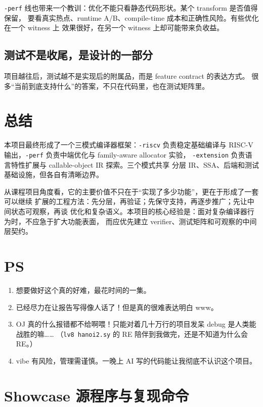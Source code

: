 \documentclass[UTF8,a4paper,11pt]{ctexart}
\begin{document}
\texttt{-perf} 线也带来一个教训：优化不能只看静态代码形状。某个 transform 是否值得保留，
要看真实热点、runtime A/B、compile-time 成本和正确性风险。有些优化在一个 witness 上
效果很好，在另一个 witness 上却可能带来负收益。

\subsection{测试不是收尾，是设计的一部分}

项目越往后，测试越不是实现后的附属品，而是 feature contract 的表达方式。
很多“当前到底支持什么”的答案，不只在代码里，也在测试矩阵里。

\section{总结}

本项目最终形成了一个三模式编译器框架：\texttt{-riscv} 负责稳定基础编译与
RISC-V 输出，\texttt{-perf} 负责中端优化与 family-aware allocator 实验，
\texttt{-extension} 负责语言特性扩展与 callable-object IR 探索。三个模式共享
分层 IR、SSA、后端和测试基础设施，但各自有清晰边界。

从课程项目角度看，它的主要价值不只在于“实现了多少功能”，更在于形成了一套可以继续
扩展的工程方法：先分层，再验证；先保守支持，再逐步推广；先让中间状态可观察，再谈
优化和复杂语义。本项目的核心经验是：面对复杂编译器行为时，不应急于扩大功能表面，
而应优先建立 verifier、测试矩阵和可观察的中间层契约。

\section*{PS}

\begin{enumerate}[label=\arabic*.]
  \item 想要做好这个真的好难，最花时间的一集。
  \item 已经尽力在让报告写得像人话了！但是真的很难表达明白 www。
  \item OJ 真的什么报错都不给啊喂！只能对着几十万行的项目发呆 debug 是人类能战胜的嘛……
  （\texttt{lv8 hanoi2.sy} 的 RE 陪伴到我做完，还是不知道为什么会 RE。）
  \item vibe 有风险，管理需谨慎。一晚上 AI 写的代码能让我彻底不认识这个项目。
\end{enumerate}

\appendix

\section{Showcase 源程序与复现命令}
\end{document}
